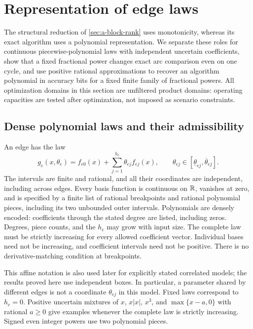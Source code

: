 \section{Representation of edge laws}
\label{sec:a-laws}

The structural reduction of \cref{sec:a-block-rank} uses monotonicity,
whereas its exact algorithm uses a polynomial representation. We
separate these roles for continuous piecewise-polynomial laws with
independent uncertain coefficients, show that a fixed fractional power
changes exact arc comparison even on one cycle, and use positive
rational approximations to recover an algorithm polynomial in accuracy
bits for a fixed finite family of fractional powers. All optimization
domains in this section are unfiltered product domains: operating
capacities are tested after optimization, not imposed as scenario
constraints.

\subsection{Dense polynomial laws and their admissibility}
\label{subsec:a-law-model}
An edge has the law
\begin{equation}
 g_e(x,\theta_e)=f_{e0}(x)+\sum_{j=1}^{h_e}\theta_{ej}f_{ej}(x),
 \qquad \theta_{ej}\in[\underline\theta_{ej},\overline\theta_{ej}].
 \label{eq:a-law-affine}
\end{equation}
The intervals are finite and rational, and all their coordinates are
independent, including across edges. Every basis function is continuous
on $\mathbb{R}$, vanishes at zero, and is specified by a finite list of rational
breakpoints and rational polynomial pieces, including its two unbounded
outer intervals. Polynomials are densely encoded: coefficients through
the stated degree are listed, including zeros. Degrees, piece counts,
and the $h_e$ may grow with input size. The complete law must be strictly
increasing for every allowed coefficient vector. Individual bases need
not be increasing, and coefficient intervals need not be positive.
There is no derivative-matching condition at breakpoints.

This affine notation is also used later for explicitly stated
correlated models; the results proved here use independent boxes. In
particular, a parameter shared by different edges is not a coordinate
$\theta_{ej}$ in this model. Fixed laws correspond to $h_e=0$. Positive uncertain mixtures
of $x$, $x|x|$, $x^3$, and $\max\{x-a,0\}$ with rational $a\ge0$ give
examples whenever the complete law is strictly increasing. Signed even
integer powers use two polynomial pieces.

